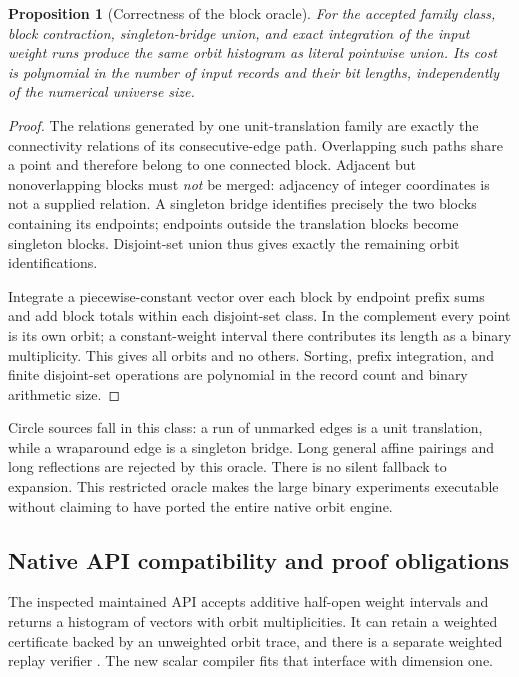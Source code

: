 \documentclass[11pt]{article}
\newtheorem{proposition}[theorem]{Proposition}
\theoremstyle{definition}\newtheorem{definition}[theorem]{Definition}\newtheorem{example}[theorem]{Example}
\theoremstyle{remark}\newtheorem{remark}[theorem]{Remark}
\begin{document}
\begin{proposition}[Correctness of the block oracle]
\label{prop:block}
For the accepted family class, block contraction, singleton-bridge union, and exact integration of the input weight runs produce the same orbit histogram as literal pointwise union. Its cost is polynomial in the number of input records and their bit lengths, independently of the numerical universe size.
\end{proposition}
\begin{proof}
The relations generated by one unit-translation family are exactly the connectivity relations of its consecutive-edge path. Overlapping such paths share a point and therefore belong to one connected block. Adjacent but nonoverlapping blocks must \emph{not} be merged: adjacency of integer coordinates is not a supplied relation. A singleton bridge identifies precisely the two blocks containing its endpoints; endpoints outside the translation blocks become singleton blocks. Disjoint-set union thus gives exactly the remaining orbit identifications.

Integrate a piecewise-constant vector over each block by endpoint prefix sums and add block totals within each disjoint-set class. In the complement every point is its own orbit; a constant-weight interval there contributes its length as a binary multiplicity. This gives all orbits and no others. Sorting, prefix integration, and finite disjoint-set operations are polynomial in the record count and binary arithmetic size.
\end{proof}

Circle sources fall in this class: a run of unmarked edges is a unit translation, while a wraparound edge is a singleton bridge. Long general affine pairings and long reflections are rejected by this oracle. There is no silent fallback to expansion. This restricted oracle makes the large binary experiments executable without claiming to have ported the entire native orbit engine.

\subsection{Native API compatibility and proof obligations}
The inspected maintained API accepts additive half-open weight intervals and returns a histogram of vectors with orbit multiplicities. It can retain a weighted certificate backed by an unweighted orbit trace, and there is a separate weighted replay verifier \cite{weighted,weightedverify}. The new scalar compiler fits that interface with dimension one.
\end{document}
